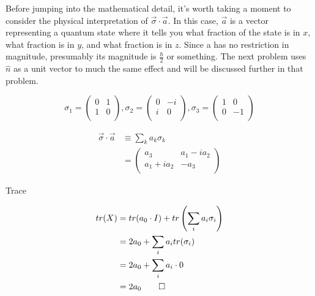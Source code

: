 \begin{answer}
  Before jumping into the mathematical detail, it's worth taking a
  moment to consider the physical interpretation of $\vec{\sigma} \cdot
  \vec{a}$.  In this case, $\vec{a}$ is a vector representing a quantum
  state where it tells you what fraction of the state is in $x$, what
  fraction is in $y$, and what fraction is in $z$.  Since a has no
  restriction in magnitude, presumably its magnitude is $\frac \hbar 2$
  or something.  The next problem uses $\hat{n}$ as a unit vector to
  much the same effect and will be discussed further in that problem.

  \begin{equation*}
    \tag{3.50}
    \sigma_1 =
    \begin{pmatrix}
      0 & 1 \\
      1 & 0 \\
    \end{pmatrix},
    \sigma_2 =
    \begin{pmatrix}
      0 & -i \\
      i &  0 \\
    \end{pmatrix},
    \sigma_3 =
    \begin{pmatrix}
      1 &  0 \\
      0 & -1 \\
    \end{pmatrix}
  \end{equation*}

  \begin{equation*}
    \tag{3.56}
    \begin{split}
      \vec{\sigma} \cdot \vec{a} &\equiv \sum_k a_k \sigma_k \\
      &= \begin{pmatrix}
        a_3        & a_1 - ia_2 \\
        a_1 + ia_2 & -a_3 \\
      \end{pmatrix}
    \end{split}
  \end{equation*}


  \begin{answerpart}{Trace}

    \begin{equation}
      \begin{split}
        tr(X)
        &= tr(a_0 \cdot I) + tr\left( \sum_i a_i \sigma_i \right) \\
        &= 2a_0 + \sum_i a_i tr(\sigma_i) \\
        &= 2a_0 + \sum_i a_i \cdot 0 \\
        &= 2a_0
        \qed
      \end{split}
    \end{equation}


\end{answerpart}
\end{answer}
